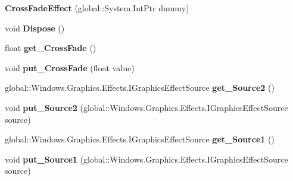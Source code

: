 \begin{DoxyCompactItemize}
{\bfseries Cross\+Fade\+Effect} (global\+::\+System.\+Int\+Ptr dummy)
\item 
\mbox{\label{class_microsoft_1_1_graphics_1_1_canvas_1_1_effects_1_1_cross_fade_effect_a7e3429fb00e0d8c989d1ee019f8e917d}} 
void {\bfseries Dispose} ()
\item 
\mbox{\label{class_microsoft_1_1_graphics_1_1_canvas_1_1_effects_1_1_cross_fade_effect_a03a1b2e46780db48c746c36e0a0328df}} 
float {\bfseries get\+\_\+\+Cross\+Fade} ()
\item 
\mbox{\label{class_microsoft_1_1_graphics_1_1_canvas_1_1_effects_1_1_cross_fade_effect_a1bb024927d16d9d1077994bdd49ff1b3}} 
void {\bfseries put\+\_\+\+Cross\+Fade} (float value)
\item 
\mbox{\label{class_microsoft_1_1_graphics_1_1_canvas_1_1_effects_1_1_cross_fade_effect_ae64842db8377a81fbe51b6e9c8230622}} 
global\+::\+Windows.\+Graphics.\+Effects.\+I\+Graphics\+Effect\+Source {\bfseries get\+\_\+\+Source2} ()
\item 
\mbox{\label{class_microsoft_1_1_graphics_1_1_canvas_1_1_effects_1_1_cross_fade_effect_a03f909bfef26ae588f520b5c6f561b89}} 
void {\bfseries put\+\_\+\+Source2} (global\+::\+Windows.\+Graphics.\+Effects.\+I\+Graphics\+Effect\+Source source)
\item 
\mbox{\label{class_microsoft_1_1_graphics_1_1_canvas_1_1_effects_1_1_cross_fade_effect_a515cb86c3b146b49a043c5a2f2fa0e34}} 
global\+::\+Windows.\+Graphics.\+Effects.\+I\+Graphics\+Effect\+Source {\bfseries get\+\_\+\+Source1} ()
\item 
\mbox{\label{class_microsoft_1_1_graphics_1_1_canvas_1_1_effects_1_1_cross_fade_effect_a72eb46d22afb55188148751eda6335e6}} 
void {\bfseries put\+\_\+\+Source1} (global\+::\+Windows.\+Graphics.\+Effects.\+I\+Graphics\+Effect\+Source source)

\end{DoxyCompactItemize}

